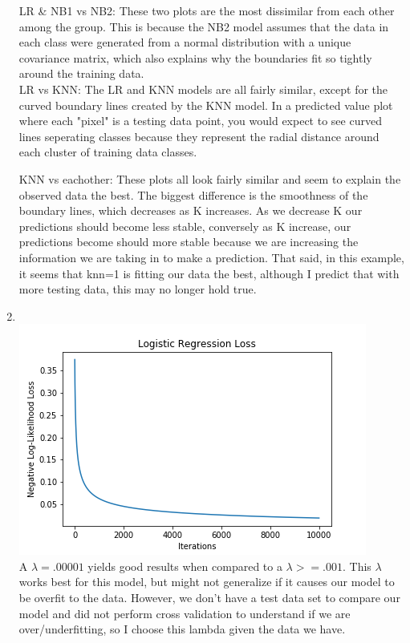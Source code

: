 \documentclass[submit]{harvardml}
\begin{document}
\begin{enumerate}
    LR & NB1 vs NB2: These two plots are the most dissimilar from each other among the group. This is because the NB2 model assumes that the data in each class were generated from a normal distribution with a unique covariance matrix, which also explains why the boundaries fit so tightly around the training data. \\
    
    LR vs KNN: The LR and KNN models are all fairly similar, except for the curved boundary lines created by the KNN model. In a predicted value plot where each "pixel" is a testing data point, you would expect to see curved lines seperating classes because they represent the radial distance around each cluster of training data classes.
    
    KNN vs eachother: These plots all look fairly similar and seem to explain the observed data the best. The biggest difference is the smoothness of the boundary lines, which decreases as K increases. As we decrease K our predictions should become less stable, conversely as K increase, our predictions become should more stable because we are increasing the information we are taking in to make a prediction. That said, in this example, it seems that knn=1 is fitting our data the best, although I predict that with more testing data, this may no longer hold true. \\

    
    
    \item \\
    \includegraphics[scale=0.6]{hw2/Logistic Regression Loss.png} \\
    A $\lambda = .00001$ yields good results when compared to a $\lambda >= .001$. This $\lambda$ works best for this model, but might not generalize if it causes our model to be overfit to the data. However, we don't have a test data set to compare our model and did not perform cross validation to understand if we are over/underfitting, so I choose this lambda given the data we have. 
    

\end{enumerate}
\end{document}
